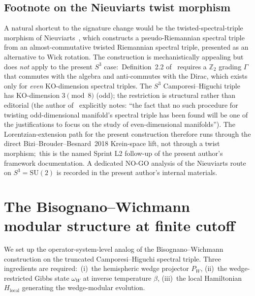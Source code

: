 \documentclass[11pt,a4paper]{article}
\theoremstyle{plain}
\theoremstyle{definition}
\newcommand{\sthree}{S^{3}}
\newcommand{\Z}{\mathbb{Z}}
\newcommand{\SU}{\mathrm{SU}}
\begin{document}
\subsection{Footnote on the Nieuviarts twist morphism}
\label{sec:nieuviarts_footnote}

A natural shortcut to the signature change would be the
twisted-spectral-triple morphism of
Nieuviarts~\cite{nieuviarts2025a, nieuviarts2024, nieuviarts2025b_proceedings},
which constructs a pseudo-Riemannian spectral triple from an
almost-commutative twisted Riemannian spectral triple, presented as
an alternative to Wick rotation. The construction is mechanistically
appealing but does \emph{not} apply to the present $\sthree$ case:\
Definition~2.2 of~\cite{nieuviarts2025a} requires a $\Z_2$ grading
$\Gamma$ that commutes with the algebra and anti-commutes with the
Dirac, which exists only for \emph{even} KO-dimension spectral
triples. The $\sthree$ Camporesi--Higuchi triple has KO-dimension
$3 \pmod 8$ (odd); the restriction is structural rather than
editorial (the author of~\cite{nieuviarts2025a} explicitly notes:
``the fact that no such procedure for twisting odd-dimensional
manifold's spectral triple has been found will be one of the
justifications to focus on the study of even-dimensional manifolds'').
The Lorentzian-extension path for the present construction therefore
runs through the direct Bizi--Brouder--Besnard~2018 Krein-space lift,
not through a twist morphism;\ this is the named Sprint L2 follow-up
of the present author's framework documentation. A dedicated NO-GO
analysis of the Nieuviarts route on $\sthree = \SU(2)$ is recorded in
the present author's internal materials.

\section{The Bisognano--Wichmann modular structure at finite cutoff}
\label{sec:bw_at_finite_cutoff}

We set up the operator-system-level analog of the
Bisognano--Wichmann construction on the truncated Camporesi--Higuchi
spectral triple. Three ingredients are required:\ (i)~the hemispheric
wedge projector $P_W$, (ii)~the wedge-restricted Gibbs state
$\omega_W$ at inverse temperature $\beta$, (iii)~the local Hamiltonian
$H_{\mathrm{local}}$ generating the wedge-modular evolution.
\end{document}
